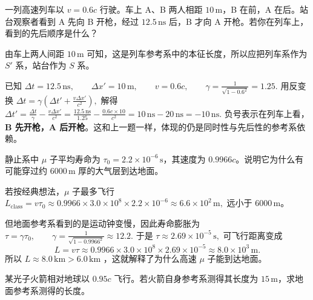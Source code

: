 \documentclass[lang=cn,11pt]{elegantbook}
\begin{document}
\begin{exercise}[列车枪战中的先后顺序]
一列高速列车以 \(v=0.6c\) 行驶。车上 A、B 两人相距 \(10\,\mathrm{m}\)，B 在前，A 在后。站台观察者看到 A 先向 B 开枪，经过 \(12.5\,\mathrm{ns}\) 后，B 才向 A 开枪。若你在列车上，看到的先后顺序是什么？
\end{exercise}

\begin{solution}
由车上两人间距 \(10\,\mathrm{m}\) 可知，这是列车参考系中的本征长度，所以应把列车系作为 \(S'\) 系，站台作为 \(S\) 系。

已知
 \(\Delta t=12.5\,\mathrm{ns}, \qquad \Delta x'=10\,\mathrm{m}, \qquad v=0.6c, \qquad \gamma=\frac{1}{\sqrt{1-0.6^2}}=1.25.\) 
用反变换
 \(\Delta t=\gamma\left(\Delta t'+\frac{v\Delta x'}{c^2}\right),\) 
解得
 \(\Delta t'=\frac{\Delta t}{\gamma}-\frac{v\Delta x'}{c^2} =\frac{12.5\,\mathrm{ns}}{1.25}-\frac{0.6c\times 10}{c^2} =10\,\mathrm{ns}-20\,\mathrm{ns} =-10\,\mathrm{ns}.\) 
负号表示在列车上看，\textbf{B 先开枪，A 后开枪}。这和上一题一样，体现的仍是同时性与先后性的参考系依赖。
\end{solution}

\begin{exercise}[为何 \(\mu\) 子能穿透大气层]
静止系中 \(\mu\) 子平均寿命为 \(\tau_0=2.2\times 10^{-6}\,\mathrm{s}\)，其速度为 \(0.9966c\)。说明它为什么有可能穿过约 \(6000\,\mathrm{m}\) 厚的大气层到达地面。
\end{exercise}

\begin{solution}
若按经典想法，\(\mu\) 子最多飞行
 \(L_{\mathrm{class}}=v\tau_0 \approx 0.9966\times 3.0\times 10^8\times 2.2\times 10^{-6} \approx 6.6\times 10^2\,\mathrm{m},\) 
远小于 \(6000\,\mathrm{m}\)。

但地面参考系看到的是运动钟变慢，因此寿命膨胀为
 \(\tau=\gamma\tau_0, \qquad \gamma=\frac{1}{\sqrt{1-0.9966^2}}\approx 12.2.\) 
于是
 \(\tau\approx 2.69\times 10^{-5}\,\mathrm{s},\) 
可飞行距离变成
\[
L=v\tau\approx 0.9966\times 3.0\times 10^8\times 2.69\times 10^{-5}
\approx 8.0\times 10^3\,\mathrm{m}.
\]
所以
 \(\boxed{L\approx 8.0\,\mathrm{km}>6.0\,\mathrm{km}}\) 
，这就解释了为什么高速 \(\mu\) 子能到达地面。
\end{solution}

\begin{exercise}[火箭在地面参考系中的长度]
某光子火箭相对地球以 \(0.95c\) 飞行。若火箭自身参考系测得其长度为 \(15\,\mathrm{m}\)，求地面参考系测得的长度。
\end{exercise}
\end{document}
